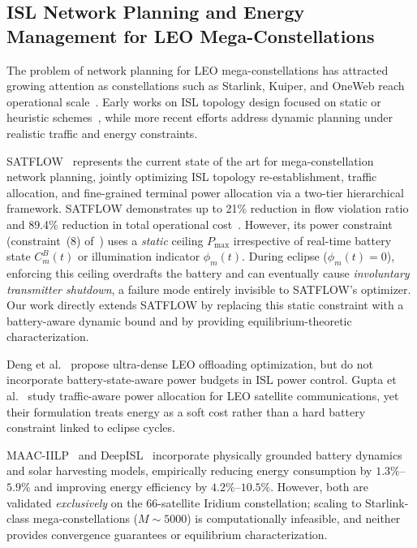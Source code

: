 \documentclass[journal]{IEEEtran}
\newcommand{\CB}{C^{B}}
\begin{document}
\subsection{ISL Network Planning and Energy Management
for LEO Mega-Constellations}

The problem of network planning for LEO mega-constellations has attracted growing attention as constellations such as Starlink, Kuiper, and OneWeb reach operational scale~\cite{kodheli2020survey}. Early works on ISL topology design focused on static or heuristic schemes~\cite{leyva2021connectivity,di2019ultra}, while more recent efforts address dynamic planning under realistic traffic and energy constraints.

SATFLOW~\cite{cen2024satflow} represents the current state of the art for mega-constellation network planning, jointly optimizing ISL topology re-establishment, traffic allocation, and fine-grained terminal power allocation via a two-tier hierarchical framework. SATFLOW demonstrates up to 21\% reduction in flow violation ratio and 89.4\% reduction in total operational cost~\cite{cen2024satflow}. However, its power constraint (constraint~(8) of~\cite{cen2024satflow}) uses a \emph{static} ceiling $P_{\max}$ irrespective of real-time battery state $\CB_m(t)$ or illumination indicator $\phi_m(t)$. During eclipse ($\phi_m(t)=0$), enforcing this ceiling overdrafts the battery and can eventually cause
\emph{involuntary transmitter shutdown}, a failure
mode entirely invisible to SATFLOW's optimizer. Our work directly extends SATFLOW by replacing this static constraint with a battery-aware dynamic bound and by providing equilibrium-theoretic characterization.

Deng et al.~\cite{deng2020ultra} propose ultra-dense LEO offloading optimization, but do not incorporate battery-state-aware power budgets in ISL power control. Gupta et al.~\cite{gupta2025energyefficient} study traffic-aware power allocation for LEO satellite communications, yet their formulation treats energy as a soft cost rather than a hard battery constraint linked to eclipse cycles.

MAAC-IILP~\cite{li2023energy} and DeepISL~\cite{li2023deepisl} incorporate physically grounded battery dynamics and solar harvesting models, empirically reducing energy consumption by $1.3\%$--$5.9\%$ and improving energy efficiency by $4.2\%$--$10.5\%$. However, both are validated \emph{exclusively} on the 66-satellite Iridium constellation; scaling to Starlink-class mega-constellations ($M\!\sim\!5000$) is computationally infeasible, and neither provides convergence guarantees or equilibrium characterization.
\end{document}
